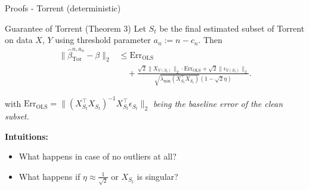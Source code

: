 \begin{frame}{Proofs - Torrent (deterministic)}
    \begin{block}{Guarantee of Torrent (Theorem 3)}
    Let $S_t$ be the final estimated subset of Torrent on data $X$, $Y$ using threshold parameter $a_n := n - c_n$. Then
        \begin{equation*}
        \begin{aligned}
        \|\hat{\beta}_{\text{Tor}}^{n,a_n} - \beta\|_2 &\leq \text{Err}_{\text{OLS}} \\
        &\quad + \frac{\sqrt{2}\|X_{V(S_t)}\|_2 \cdot \text{Err}_{\text{OLS}} + \sqrt{2}\|\epsilon_{V(S_t)}\|_2}{\sqrt{\lambda_{\min}(X_{S_t}^\top X_{S_t})}(1 - \sqrt{2}\eta)}.
        \end{aligned}
        \end{equation*}
        
        \small with $\text{Err}_{\text{OLS}} = \|(X_{S_t}^\top X_{S_t})^{-1} X_{S_t}^\top \epsilon_{S_t}\|_2$ \textit{being the baseline error of the clean subset.}
    \end{block}
    \textbf{Intuitions:}
    \begin{itemize}
        \item What happens in case of no outliers at all?
        \item What happens if $\eta \approx \frac{1}{\sqrt{2}}$ or $X_{S_t}$ is singular?
    \end{itemize}
\end{frame}

